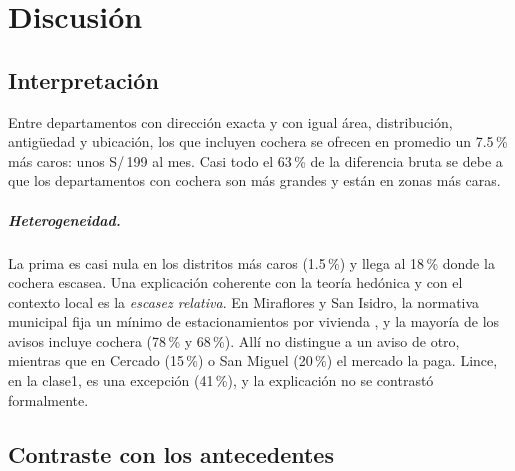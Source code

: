 \chapter{Discusión}\label{cap:discusion}

\section{Interpretación}

Entre departamentos con dirección exacta y con igual área, distribución, antigüedad y ubicación, los que incluyen cochera se ofrecen en promedio un 7.5\,\% más caros: unos S/\,199 al mes. Casi todo el 63\,\% de la diferencia bruta se debe a que los departamentos con cochera son más grandes y están en zonas más caras.

\paragraph{Heterogeneidad.} La prima es casi nula en los distritos más caros (1.5\,\%) y llega al 18\,\% donde la cochera escasea. Una explicación coherente con la teoría hedónica y con el contexto local es la \emph{escasez relativa}. En Miraflores y San Isidro, la normativa municipal fija un mínimo de estacionamientos por vivienda \citep{miraflores2011,sanisidro2020}, y la mayoría de los avisos incluye cochera (78\,\% y 68\,\%). Allí no distingue a un aviso de otro, mientras que en Cercado (15\,\%) o San Miguel (20\,\%) el mercado la paga. Lince, en la clase1, es una excepción (41\,\%), y la explicación no se contrastó formalmente.

\section{Contraste con los antecedentes}

